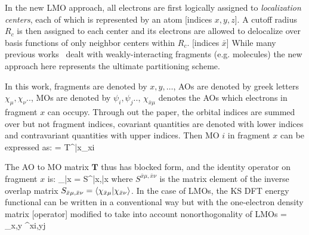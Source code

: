 \documentclass[aps,prl,twocolumn,reprint,amsmath,amssymb]{revtex4-1}
\begin{document}
\label{marker:theory} In the new LMO approach, all electrons are first logically assigned to \emph{localization centers}, each of which is represented by an atom [indices $x,y,z$]. A cutoff radius $R_c$ is then assigned to each center and its electrons are allowed to delocalize over basis functions of only neighbor centers within $R_c$. [indices $\bar{x}$] %
%
%
While many previous works~\cite{ZZZ} dealt with weakly-interacting fragments (e.g. molecules) the new approach here represents the ultimate partitioning scheme.

In this work, fragments are denoted by $x,y,\ldots$, AOs are denoted by greek letters $\chi_\mu,\chi_\nu ..$, MOs are denoted by $\psi_i,\psi_j..$, $\chi_{\bar{x}\mu}$ denotes the AOs which electrons in fragment $x$ can occupy. Through out the paper, the orbital indices are summed over but not fragment indices, covariant quantities are denoted with lower indices and contravariant quantities with upper indices. Then MO $i$ in fragment $x$ can be expressed as:
\bea
{} =  {T^{\bar{x}\mu}}_{xi}
\label{eq:LMO}
\eea

The AO to MO matrix $\mathbf{T}$ thus has blocked form, and the identity operator on fragment $x$ is:
%
\bea
{}_{\bar{x}} =  S^{\bar{x}\mu,\bar{x}\nu} 
\eea
%
where $S^{\bar{x}\mu,\bar{x}\nu}$ is the matrix element of the inverse overlap matrix $S_{\bar{x}\mu,\bar{x}\nu} = \langle  \chi_{\bar{x}\mu} \vert  \chi_{\bar{x}\nu} \rangle $. In the case of LMOs, the KS DFT energy functional can be written in a conventional way but with the one-electron density matrix [operator] modified to take into account nonorthogonality of LMOs
\bea \label{eq:dm}
 = \sum_{x,y}  \sigma^{xi,yj} 
\eea
%
\end{document}

